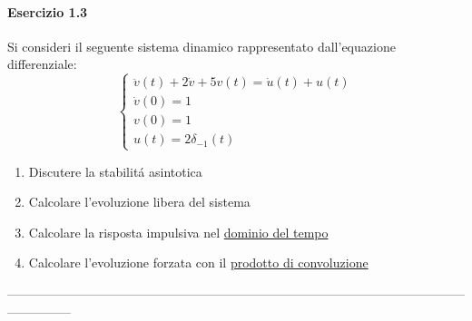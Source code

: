 \documentclass[12pt,a4paper]{article}
\begin{document}
	\paragraph*{Esercizio 1.3}
	Si consideri il seguente sistema dinamico rappresentato dall'equazione differenziale:
	\[
		\begin{cases}
			\ddot{v}(t) + 2\dot{v} + 5v(t) = \dot{u}(t) + u(t)\\
			\dot{v}(0) = 1\\
			v(0) = 1\\
			u(t) = 2\delta_{-1}(t)
		\end{cases}
	\]
	\begin{enumerate}
		\item Discutere la stabilit\'a asintotica
		\item Calcolare l'evoluzione libera del sistema
		\item Calcolare la risposta impulsiva nel \underline{dominio del tempo}
		\item Calcolare l'evoluzione forzata con il \underline{prodotto di convoluzione}
	\end{enumerate}
	---------------------------------------------------------------------------------------------------------------------------\\
\end{document}
